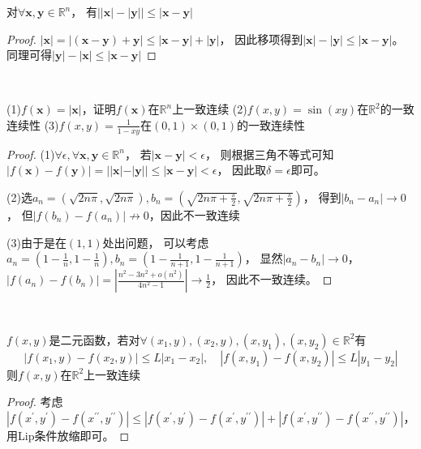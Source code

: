 \begin{lemma}[多元三角不等式]
  对$\forall \mathbf{x}, \mathbf{y} \in \mathbb{R}^n$，
  有$\left| |\mathbf{x}| - |\mathbf{y}| \right| \leq |\mathbf{x} - \mathbf{y}|$
\end{lemma}

\begin{proof}
  $|\mathbf{x}| = |(\mathbf{x}-\mathbf{y}) + \mathbf{y}| \leq |\mathbf{x} - \mathbf{y}| + |\mathbf{y}|$，
  因此移项得到$|\mathbf{x}| - |\mathbf{y}| \leq |\mathbf{x} - \mathbf{y}|$。
  同理可得$|\mathbf{y}| - |\mathbf{x}| \leq |\mathbf{x} - \mathbf{y}|$
\end{proof}

~

\begin{exercise}[多元一致连续]
  (1)$f(\mathbf{x}) = |\mathbf{x}|$，证明$f(\mathbf{x})$在$\mathbb{R}^n$上一致连续
  (2)$f(x,y) = \sin(xy)$在$\mathbb{R}^2$的一致连续性
  (3)$f(x,y) = \frac{1}{1 - xy}$在$(0,1) \times (0,1)$的一致连续性
\end{exercise}

\begin{proof}
  (1)$\forall \epsilon, \forall \mathbf{x},\mathbf{y} \in \mathbb{R}^n$，
  若$|\mathbf{x} - \mathbf{y}| < \epsilon$，
  则根据三角不等式可知$|f(\mathbf{x}) - f(\mathbf{y})| = ||\mathbf{x}| - |\mathbf{y}|| \leq |\mathbf{x} - \mathbf{y}| < \epsilon$，
  因此取$\delta = \epsilon$即可。

  (2)选$a_n = (\sqrt{2n\pi}, \sqrt{2n\pi}), b_n = (\sqrt{2n\pi + \frac{\pi}{2}}, \sqrt{2n\pi + \frac{\pi}{2}})$，
  得到$|b_n - a_n| \rightarrow 0$，
  但$|f(b_n) - f(a_n)| \not \rightarrow 0$，因此不一致连续

  (3)由于是在$(1,1)$处出问题，
  可以考虑$a_n = (1 - \frac{1}{n}, 1 - \frac{1}{n}), b_n = (1 - \frac{1}{n+1}, 1 - \frac{1}{n+1})$，
  显然$|a_n - b_n| \rightarrow 0$，
  $|f(a_n) - f(b_n)| = \left| \frac{n^2 - 3n^2 + o(n^2)}{4n^2 - 1} \right| \rightarrow \frac{1}{2}$，
  因此不一致连续。
\end{proof}

~

\begin{theorem}[多元Lip连续与一致连续]
  $f(x,y)$是二元函数，若对$\forall (x_1,y),(x_2,y),(x,y_1),(x,y_2) \in \mathbb{R}^2$有
  \begin{equation*}
    |f(x_1,y) - f(x_2,y)| \leq L|x_1 - x_2|, \quad |f(x,y_1) - f(x,y_2)| \leq L|y_1 - y_2|
  \end{equation*}
  则$f(x,y)$在$\mathbb{R}^2$上一致连续
\end{theorem}

\begin{proof}
  考虑$|f(x^{\prime},y^{\prime}) - f(x^{\prime\prime},y^{\prime\prime})| \leq |f(x^{\prime},y^{\prime}) - f(x^{\prime},y^{\prime\prime})| + |f(x^{\prime},y^{\prime\prime}) - f(x^{\prime\prime},y^{\prime\prime})|$，
  用Lip条件放缩即可。
\end{proof}



